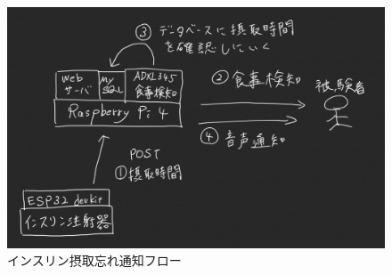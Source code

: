 \begin{figure}[htbp]
  \caption{インスリン摂取忘れ通知フロー}
  \label{fig:system_flow}
  \begin{center}
    \includegraphics[bb=0 0 1000 600,width=15cm]{assets/system_flow.png}
  \end{center}
\end{figure}

